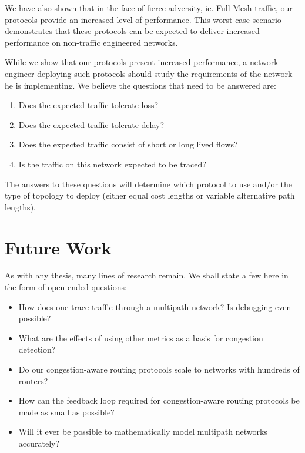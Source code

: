 We have also shown that in the face of fierce adversity, ie. Full-Mesh traffic, our protocols provide an increased level of performance. This worst case scenario demonstrates that these protocols can be expected to deliver increased performance on non-traffic engineered networks.

While we show that our protocols present increased performance, a network engineer deploying such protocols should study the requirements of the network he is implementing. We believe the questions that need to be answered are: 

\begin{enumerate}
\item Does the expected traffic tolerate loss?  
\item Does the expected traffic tolerate delay?
\item Does the expected traffic consist of short or long lived flows? 
\item Is the traffic on this network expected to be traced?
\end{enumerate}

The answers to these questions will determine which protocol to use and/or the type of topology to deploy (either equal cost lengths or variable alternative path lengths).

\section{Future Work}

As with any thesis, many lines of research remain. We shall state a few here in the form of open ended questions:

\begin{itemize}
\item How does one trace traffic through a multipath network? Is debugging even possible?
\item What are the effects of using other metrics as a basis for congestion detection?
\item Do our congestion-aware routing protocols scale to networks with hundreds of routers?
\item How can the feedback loop required for congestion-aware routing protocols be made as small as possible?
\item Will it ever be possible to mathematically model multipath networks accurately?
\end{itemize}

%
%
%
%



